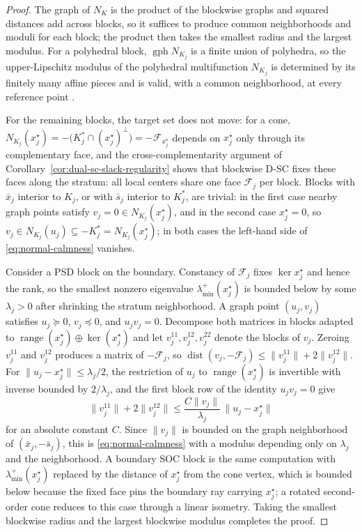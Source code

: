 \documentclass[letterpaper]{article} %
\theoremstyle{definition}
\theoremstyle{remark}
\begin{document}
\begin{proof}
The graph of $N_K$ is the product of the blockwise graphs and squared
distances add across blocks, so it suffices to produce common neighborhoods
and moduli for each block; the product then takes the smallest radius and
the largest modulus.  For a polyhedral block,
$\operatorname{gph}N_{K_j}$ is a finite union of polyhedra, so the
upper-Lipschitz modulus of the polyhedral multifunction $N_{K_j}$ is
determined by its finitely many affine pieces and is valid, with a common
neighborhood, at every reference point \cite{robinson1981continuity}.

For the remaining blocks, the target set does not move: for a cone,
$N_{K_j}(x_j^\star)
=-\bigl(K_j^*\cap(x_j^\star)^\perp\bigr)
=-\mathcal F_{x_j^\star}$
depends on $x_j^\star$ only through its complementary face, and the
cross-complementarity argument of
Corollary~\ref{cor:dual-sc-slack-regularity} shows that blockwise D-SC
fixes these faces along the stratum: all local centers share one face
$\mathcal F_j$ per block.  Blocks with $\bar x_j$ interior to $K_j$, or
with $\bar s_j$ interior to $K_j^*$, are trivial: in the first case nearby
graph points satisfy $v_j=0\in N_{K_j}(x_j^\star)$, and in the second case
$x_j^\star=0$, so
$v_j\in N_{K_j}(u_j)\subseteq-K_j^*=N_{K_j}(x_j^\star)$; in both cases the
left-hand side of \eqref{eq:normal-calmness} vanishes.

Consider a PSD block on the boundary.  Constancy of $\mathcal F_j$ fixes
$\ker x_j^\star$ and hence the rank, so the smallest nonzero eigenvalue
$\lambda^+_{\min}(x_j^\star)$ is bounded below by some $\lambda_j>0$ after
shrinking the stratum neighborhood.  A graph point $(u_j,v_j)$ satisfies
$u_j\succeq0$, $v_j\preceq0$, and $u_jv_j=0$.  Decompose both matrices in
blocks adapted to
$\operatorname{range}(x_j^\star)\oplus\ker(x_j^\star)$ and let
$v_j^{11},v_j^{12},v_j^{22}$ denote the blocks of $v_j$.  Zeroing
$v_j^{11}$ and $v_j^{12}$ produces a matrix of $-\mathcal F_j$, so
$\operatorname{dist}(v_j,-\mathcal F_j)\le\|v_j^{11}\|+2\|v_j^{12}\|$.  For
$\|u_j-x_j^\star\|\le\lambda_j/2$, the restriction of $u_j$ to
$\operatorname{range}(x_j^\star)$ is invertible with inverse bounded by
$2/\lambda_j$, and the first block row of the identity $u_jv_j=0$
give
\[
    \|v_j^{11}\|+2\|v_j^{12}\|
    \le
    \frac{C\|v_j\|}{\lambda_j}\,\|u_j-x_j^\star\|
\]
for an absolute constant $C$.  Since $\|v_j\|$ is bounded on the graph
neighborhood of $(\bar x_j,-\bar s_j)$, this is
\eqref{eq:normal-calmness} with a modulus depending only on $\lambda_j$
and the neighborhood.  A boundary SOC block is the same computation with
$\lambda^+_{\min}(x_j^\star)$ replaced by the distance of $x_j^\star$ from
the cone vertex, which is bounded below because the fixed face pins the
boundary ray carrying $x_j^\star$; a rotated second-order cone reduces to
this case through a linear isometry.  Taking the smallest blockwise radius
and the largest blockwise modulus completes the proof.
\end{proof}
\end{document}

